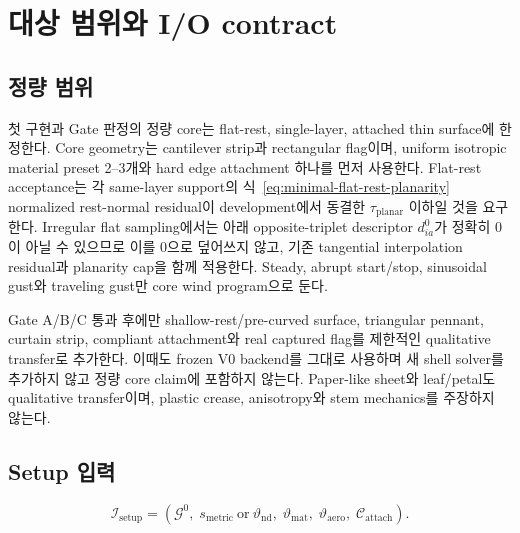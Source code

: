 \documentclass[11pt]{article}
\begin{document}
\section{대상 범위와 I/O contract}

\subsection{정량 범위}

첫 구현과 Gate 판정의 정량 core는 flat-rest, single-layer, attached thin surface에 한정한다.
Core geometry는 cantilever strip과 rectangular flag이며, uniform isotropic material preset
2--3개와 hard edge attachment 하나를 먼저 사용한다. Flat-rest acceptance는 각 same-layer
support의 식~\eqref{eq:minimal-flat-rest-planarity} normalized rest-normal residual이 development에서 동결한
\(\tau_{\mathrm{planar}}\) 이하일 것을 요구한다. Irregular flat sampling에서는 아래
opposite-triplet descriptor \(d_{ia}^0\)가 정확히 0이 아닐 수 있으므로 이를 0으로 덮어쓰지 않고,
기존 tangential interpolation residual과 planarity cap을 함께 적용한다.
Steady, abrupt start/stop, sinusoidal gust와 traveling gust만 core wind program으로 둔다.

Gate A/B/C 통과 후에만 shallow-rest/pre-curved surface, triangular pennant, curtain strip,
compliant attachment와 real captured flag를 제한적인 qualitative transfer로 추가한다.
이때도 frozen V0 backend를 그대로 사용하며 새 shell solver를 추가하지 않고 정량 core claim에
포함하지 않는다. Paper-like sheet와 leaf/petal도 qualitative transfer이며,
plastic crease, anisotropy와 stem mechanics를 주장하지 않는다.

\subsection{Setup 입력}

\begin{equation}
  \mathcal I_{\mathrm{setup}}
  =
  \left(
    \mathcal G^0,\;
    s_{\mathrm{metric}}\ \text{or}\ \vartheta_{\mathrm{nd}},\;
    \vartheta_{\mathrm{mat}},\;
    \vartheta_{\mathrm{aero}},\;
    \mathcal C_{\mathrm{attach}}
  \right).
  \label{eq:minimal-setup-input}
\end{equation}
\end{document}
